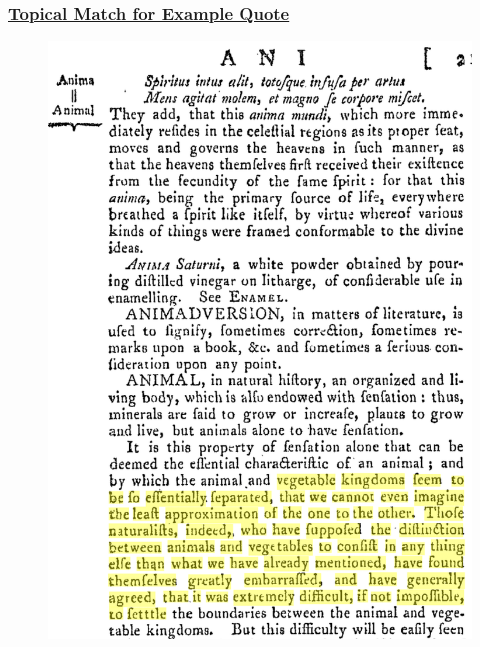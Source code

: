 \documentclass[pdf]{beamer}
\begin{document}
\begin{frame}
  \frametitle{\href{https://gallica-kaiku.rahtiapp.fi/?eccoId=1741200102&offsetStart=141008&offsetEnd=141430}{Topical Match for Example Quote}}
  \begin{figure}[htbp]
    \centering
    \includegraphics[width=\linewidth,height=0.8\textheight,keepaspectratio]{images/topical_match.png}
  \end{figure}

\end{frame}
\end{document}

